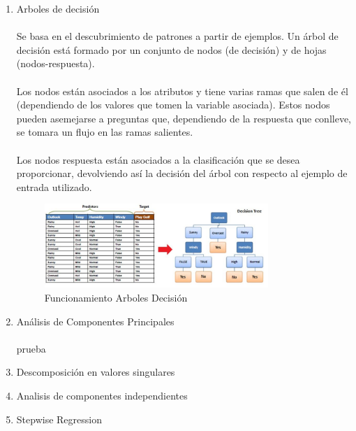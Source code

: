 \documentclass[spanish,12pt, a4paper,twoside]{paper}
\begin{document}
\begin{enumerate}
\item Arboles de decisión
\paragraph{} Se basa en el descubrimiento de patrones a partir de ejemplos. Un árbol de decisión está formado por un conjunto de nodos (de decisión) y de hojas (nodos-respuesta).
\paragraph{} 
Los nodos están asociados a los atributos y tiene varias ramas que salen de él (dependiendo de los valores que tomen la variable asociada). Estos nodos pueden asemejarse a preguntas que, dependiendo de la respuesta que conlleve, se tomara un flujo en las ramas salientes.
\paragraph{} 
Los nodos respuesta están asociados a la clasificación que se desea proporcionar, devolviendo así la decisión del árbol con respecto al ejemplo de entrada utilizado.

\begin{figure}[htb]
\centering
 \includegraphics[width=0.8\textwidth]{recursos/arbol_decision_img1}
\caption{Funcionamiento Arboles Decisión}
\label{fig:fun_arb_dec}
\end{figure}


\item Análisis de Componentes Principales
\paragraph{} prueba
\item Descomposición en valores singulares
\item Analisis de componentes independientes
\item Stepwise Regression
\end{enumerate}
\end{document}
